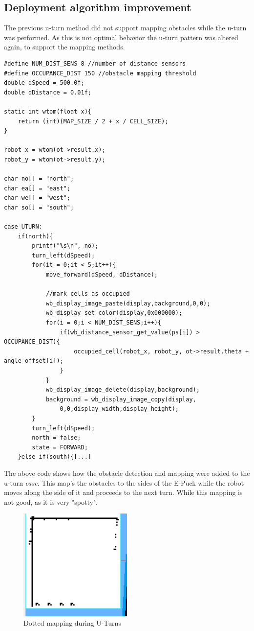 \subsection{Deployment algorithm improvement}
\label{deployment_improvement}
The previous u-turn method did not support mapping obstacles while the u-turn was performed. As this is not optimal behavior the u-turn pattern was altered again, to support the mapping methods. 

\begin{lstlisting}[caption={U-turn improved with obstacle detection and mapping}, label={uturn_code}]
#define NUM_DIST_SENS 8 //number of distance sensors 
#define OCCUPANCE_DIST 150 //obstacle mapping threshold
double dSpeed = 500.0f;
double dDistance = 0.01f;

static int wtom(float x){
	return (int)(MAP_SIZE / 2 + x / CELL_SIZE);
}

robot_x = wtom(ot->result.x);
robot_y = wtom(ot->result.y);

char no[] = "north";
char ea[] = "east";
char we[] = "west";
char so[] = "south";

case UTURN:
	if(north){
		printf("%s\n", no);
		turn_left(dSpeed);
		for(it = 0;it < 5;it++){
			move_forward(dSpeed, dDistance);
			
			//mark cells as occupied
			wb_display_image_paste(display,background,0,0);
			wb_display_set_color(display,0x000000);
			for(i = 0;i < NUM_DIST_SENS;i++){
				if(wb_distance_sensor_get_value(ps[i]) > OCCUPANCE_DIST){
					occupied_cell(robot_x, robot_y, ot->result.theta + angle_offset[i]);
				}
			}
			wb_display_image_delete(display,background);
			background = wb_display_image_copy(display,
				0,0,display_width,display_height); 
		}
		turn_left(dSpeed);
		north = false;
		state = FORWARD;
	}else if(south){[...]
\end{lstlisting}

The above code shows how the obstacle detection and mapping were added to the u-turn \textit{case}. 
This map's the obstacles to the sides of the E-Puck while the robot moves along the side of it and proceeds to the next turn. While this mapping is not good, as it is very "spotty".

\begin{figure}[h]
\centering
\includegraphics[width = 0.5\textwidth]{../../figures/map_results/dotted_uturn_mapping.png} 
\caption{Dotted mapping during U-Turns}
\label{dotted_uturn}
\end{figure}

